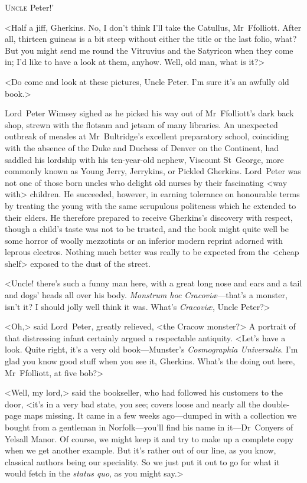 
\lettrine[ante=‘]{U}{ncle} Peter!'

\zz
<Half a jiff, Gherkins. No, I don't think I'll take the Catullus, Mr~Ffolliott. After all, thirteen guineas is a bit steep without either the title or the last folio, what? But you might send me round the Vitruvius and the Satyricon when they come in; I'd like to have a look at them, anyhow. Well, old man, what is it?>

<Do come and look at these pictures, Uncle Peter. I'm sure it's an awfully old book.>

Lord~Peter Wimsey sighed as he picked his way out of Mr~Ffolliott's dark back shop, strewn with the flotsam and jetsam of many libraries. An unexpected outbreak of measles at Mr~Bultridge's excellent preparatory school, coinciding with the absence of the Duke and Duchess of Denver on the Continent, had saddled his lordship with his ten-year-old nephew, Viscount St~George, more commonly known as Young Jerry, Jerrykins, or Pickled Gherkins. Lord~Peter was not one of those born uncles who delight old nurses by their fascinating <way with> children. He succeeded, however, in earning tolerance on honourable terms by treating the young with the same scrupulous politeness which he extended to their elders. He therefore prepared to receive Gherkins's discovery with respect, though a child's taste was not to be trusted, and the book might quite well be some horror of woolly mezzotints or an inferior modern reprint adorned with leprous electros. Nothing much better was really to be expected from the <cheap shelf> exposed to the dust of the street.

<Uncle! there's such a funny man here, with a great long nose and ears and a tail and dogs' heads all over his body. \textit{Monstrum hoc Cracoviæ}—that's a monster, isn't it? I should jolly well think it was. What's \textit{Cracoviæ}, Uncle Peter?>

<Oh,> said Lord~Peter, greatly relieved, <the Cracow monster?> A portrait of that distressing infant certainly argued a respectable antiquity. <Let's have a look. Quite right, it's a very old book—Munster's \textit{Cosmographia Universalis}. I'm glad you know good stuff when you see it, Gherkins. What's the  doing out here, Mr~Ffolliott, at five bob?>

<Well, my lord,> said the bookseller, who had followed his customers to the door, <it's in a very bad state, you see; covers loose and nearly all the double-page maps missing. It came in a few weeks ago—dumped in with a collection we bought from a gentleman in Norfolk—you'll find his name in it—Dr~Conyers of Yelsall Manor. Of course, we might keep it and try to make up a complete copy when we get another example. But it's rather out of our line, as you know, classical authors being our speciality. So we just put it out to go for what it would fetch in the \textit{status quo}, as you might say.>

